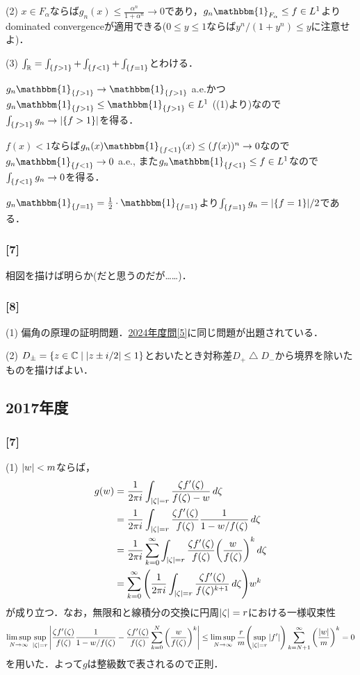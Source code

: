\documentclass[a4j]{ltjsarticle}
\newcommand{\Rset}{\mathbb{R}}
\newcommand{\Cset}{\mathbb{C}}
\newcommand{\1}{\mathbbm{1}}
\numberwithin{equation}{section}
\theoremstyle{definition}
\begin{document}
(2) $x\in F_{\alpha}$ならば$g_n(x)\leq \frac{\alpha^n}{1+\alpha^n}\to 0$であり，$g_n\1_{F_{\alpha}}\leq f\in L^1$よりdominated convergenceが適用できる($0\leq y\leq 1$ならば$y^n/(1+y^n)\leq y$に注意せよ)．

(3) $\int_{\Rset}=\int_{\qty{f>1}}+\int_{\qty{f<1}}+\int_{\qty{f=1}}$とわける．

$g_n\1_{\qty{f>1}}\to \1_{\qty{f>1}}$ a.e.かつ$g_n\1_{\qty{f>1}}\leq \1_{\qty{f>1}}\in L^1$ ((1)より)なので$\int_{\qty{f>1}}g_n\to \abs{\qty{f>1}}$を得る．

$f(x)<1$ならば$g_n(x)\1_{\qty{f<1}}(x)\leq (f(x))^n\to0$なので$g_n\1_{\qty{f<1}}\to0$ a.e., また$g_n\1_{\qty{f<1}}\leq f\in L^1$なので$\int_{\qty{f<1}}g_n\to0$を得る．

$g_n\1_{\qty{f=1}}=\frac{1}{2}\cdot\1_{\qty{f=1}}$より$\int_{\qty{f=1}}g_n=\abs{\qty{f=1}}/2$である．

\subsubsection*{[7]}
相図を描けば明らか(だと思うのだが……)．

\subsubsection*{[8]}
(1) 偏角の原理の証明問題．\hyperref[pm_2024_5]{2024年度問[5]}に同じ問題が出題されている．

(2) $D_{\pm}=\qty{z\in\Cset\mid \abs{z\pm i/2}\leq 1}$とおいたとき対称差$D_{+}\bigtriangleup D_{-}$から境界を除いたものを描けばよい．
\subsection{2017年度}
\subsubsection*{[7]}
(1) $\abs{w}<m$ならば，
\begin{align}
    g(w)&=\frac{1}{2\pi i}\int_{\abs{\zeta}=r}\frac{\zeta f'(\zeta)}{f(\zeta)-w}\,d\zeta \\
    &=\frac{1}{2\pi i}\int_{\abs{\zeta}=r}\frac{\zeta f'(\zeta)}{f(\zeta)}\frac{1}{1-w/f(\zeta)}\,d\zeta\\
    &=\frac{1}{2\pi i}\sum_{k=0}^{\infty}\int_{\abs{\zeta}=r}\frac{\zeta f'(\zeta)}{f(\zeta)}\qty(\frac{w}{f(\zeta)})^k\,d\zeta \\
    &=\sum_{k=0}^{\infty}\qty(\frac{1}{2\pi i}\int_{\abs{\zeta}=r}\frac{\zeta f'(\zeta)}{f(\zeta)^{k+1}}\,d\zeta)w^{k}
\end{align}
が成り立つ．なお，無限和と線積分の交換に円周$\abs{\zeta}=r$における一様収束性
\begin{equation}
    \limsup_{N\to\infty}\sup_{\abs{\zeta}=r}\abs{\frac{\zeta f'(\zeta)}{f(\zeta)}\frac{1}{1-w/f(\zeta)}-\frac{\zeta f'(\zeta)}{f(\zeta)}\sum_{k=0}^N \qty(\frac{w}{f(\zeta)})^k}\leq \limsup_{N\to\infty} \frac{r}{m}\qty(\sup_{\abs{\zeta}=r}\abs{f'})\sum_{k=N+1}^\infty\qty(\frac{\abs{w}}{m})^k=0 
\end{equation}
を用いた．よって$g$は整級数で表されるので正則．
\end{document}
